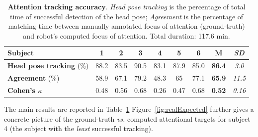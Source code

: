 \documentclass{sig-alternate}
\newcommand{\vs}{\textit{vs.}\xspace}
\begin{document}
\begin{table}[ht!]
    \centering
    \caption{\textbf{Attention tracking accuracy}. \emph{Head pose
    tracking} is the percentage of total time of successful detection of the
    head pose; \emph{Agreement} is the percentage of matching time
    between manually annotated focus of attention (ground-truth) and robot's
    computed focus of attention. Total duration: 117.6 min.}

    \begin{tabular}{p{5.5cm}cccccccc}
        \toprule
        {\bf Subject} & 1 & 2 & 3 & 4 & 5 & 6 & {\bf M} & {\it SD} \\
        \midrule
        {\bf Head pose tracking} (\%) & 88.2 & 83.5 & 90.5 & 83.1 & 87.9 & 85.0 & {\bf 86.4} & {\it 3.0} \\ 
        \midrule
        {\bf Agreement} (\%) & 58.9 & 67.1 & 79.2 & 48.3 & 65 & 77.1 & {\bf 65.9} & {\it 11.5}\\
        {\bf Cohen's $\kappa$} & 0.48 & 0.56 & 0.68 & 0.26 & 0.47 & 0.68 & {\bf 0.52} & {\it 0.16}\\
        \bottomrule
    \end{tabular}
    \label{tab:results}
\end{table}

The main results are reported in Table~\ref{tab:results}
Figure~\ref{fig:realExpected} further gives a concrete picture of the
ground-truth \vs computed attentional targets for subject 4 (the subject with
the \emph{least} successful tracking).

%
\end{document}

